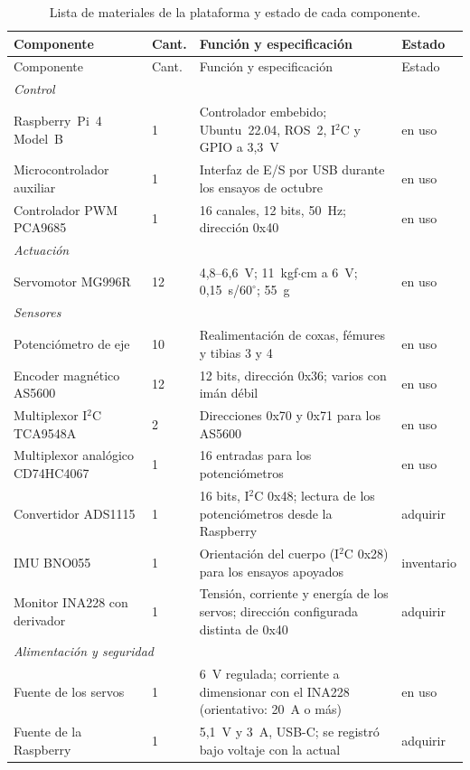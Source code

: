\begin{longtable}{p{}p{}p{}p{}}
\caption{Lista de materiales de la plataforma y estado de cada componente.}\label{tab:lista-materiales}\\
\toprule
Componente & Cant. & Función y especificación & Estado \\
\midrule
\endfirsthead
\toprule
Componente & Cant. & Función y especificación & Estado \\
\midrule
\endhead
\multicolumn{4}{l}{\textit{Control}} \\
Raspberry~Pi~4 Model~B & 1 & Controlador embebido; Ubuntu~22.04, ROS~2, I$^2$C y GPIO a 3,3~V & en uso \\
Microcontrolador auxiliar & 1 & Interfaz de E/S por USB durante los ensayos de octubre & en uso \\
Controlador PWM PCA9685 & 1 & 16 canales, 12 bits, 50~Hz; dirección 0x40 & en uso \\
\multicolumn{4}{l}{\textit{Actuación}} \\
Servomotor MG996R & 12 & 4,8--6,6~V; 11~kgf$\cdot$cm a 6~V; 0,15~s/$60^\circ$; 55~g & en uso \\
\multicolumn{4}{l}{\textit{Sensores}} \\
Potenciómetro de eje & 10 & Realimentación de coxas, fémures y tibias 3 y 4 & en uso \\
Encoder magnético AS5600 & 12 & 12 bits, dirección 0x36; varios con imán débil & en uso \\
Multiplexor I$^2$C TCA9548A & 2 & Direcciones 0x70 y 0x71 para los AS5600 & en uso \\
Multiplexor analógico CD74HC4067 & 1 & 16 entradas para los potenciómetros & en uso \\
Convertidor ADS1115 & 1 & 16 bits, I$^2$C 0x48; lectura de los potenciómetros desde la Raspberry & adquirir \\
IMU BNO055 & 1 & Orientación del cuerpo (I$^2$C 0x28) para los ensayos apoyados & inventario \\
Monitor INA228 con derivador & 1 & Tensión, corriente y energía de los servos; dirección configurada distinta de 0x40 & adquirir \\
\multicolumn{4}{l}{\textit{Alimentación y seguridad}} \\
Fuente de los servos & 1 & 6~V regulada; corriente a dimensionar con el INA228 (orientativo: 20~A o más) & en uso \\
Fuente de la Raspberry & 1 & 5,1~V y 3~A, USB-C; se registró bajo voltaje con la actual & adquirir \\

\end{longtable}
